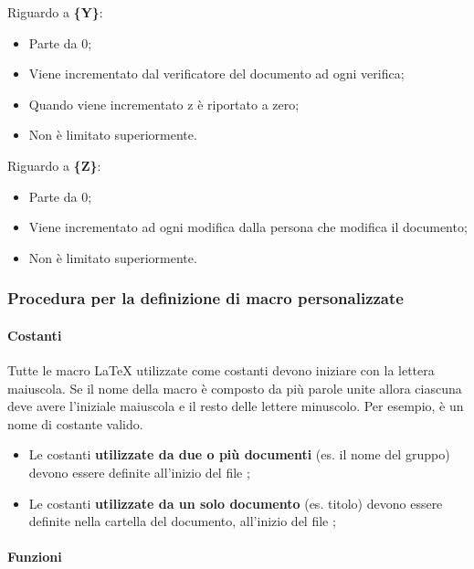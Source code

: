 Riguardo a \textbf{\{Y\}}:
\begin{itemize}
 \item Parte da 0;
 \item Viene incrementato dal verificatore del documento ad ogni verifica;
 \item Quando viene incrementato z è riportato a zero;
 \item Non è limitato superiormente.
\end{itemize}

Riguardo a \textbf{\{Z\}}:
\begin{itemize}
 \item Parte da 0;
 \item Viene incrementato ad ogni modifica dalla persona che modifica il documento;
 \item Non è limitato superiormente.
\end{itemize}


\subsubsection{Procedura per la definizione di macro personalizzate}

\paragraph{Costanti}

Tutte le macro \LaTeX{} utilizzate come costanti devono iniziare con la lettera maiuscola. Se il nome della macro è composto da più parole unite allora ciascuna deve avere l'iniziale maiuscola e il resto delle lettere minuscolo. Per esempio,  è un nome di costante valido.

\begin{itemize}
	\item Le costanti \textbf{utilizzate da due o più documenti} (es. il nome del gruppo) devono essere definite all'inizio del file ;
	
	\item Le costanti \textbf{utilizzate da un solo documento} (es. titolo) devono essere definite nella cartella del documento, all'inizio del file ;
\end{itemize}
	
\paragraph{Funzioni}

